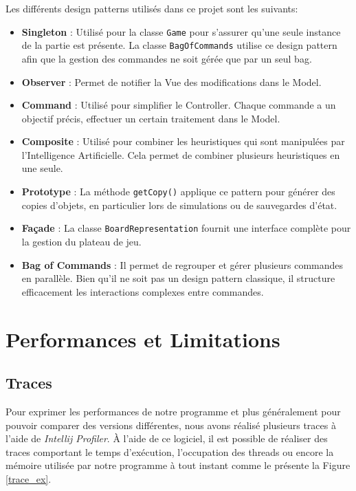 \documentclass{article}
\begin{document}
Les différents design patterns utilisés dans ce projet sont les suivants:
\begin{itemize}
    \item \textbf{Singleton} : Utilisé pour la classe \texttt{Game} pour s'assurer qu'une seule instance de la partie est présente.
    La classe \texttt{BagOfCommands} utilise ce design pattern afin que la gestion des commandes ne soit gérée que par un seul bag.
    \item \textbf{Observer} : Permet de notifier la Vue des modifications dans le Model.
    \item \textbf{Command} : Utilisé pour simplifier le Controller. Chaque commande a un objectif précis, effectuer un certain traitement dans le Model.
    \item \textbf{Composite} : Utilisé pour combiner les heuristiques qui sont manipulées par l'Intelligence Artificielle. Cela permet de combiner plusieurs heuristiques en une seule.
    \item \textbf{Prototype} : La méthode \texttt{getCopy()} applique ce pattern pour générer des copies d’objets, en particulier lors de simulations ou de sauvegardes d’état.
    \item \textbf{Façade} : La classe \texttt{BoardRepresentation} fournit une interface complète pour la gestion du plateau de jeu.
    \item \textbf{Bag of Commands} : Il permet de regrouper
    et gérer plusieurs commandes en parallèle. Bien qu’il ne soit pas un design pattern
    classique, il structure efficacement les interactions complexes entre commandes.
\end{itemize}


\section{Performances et Limitations}
\subsection{Traces}
Pour exprimer les performances de notre programme et plus généralement pour pouvoir comparer des versions différentes, nous avons réalisé plusieurs
traces à l'aide de \textit{Intellij Profiler}. À l'aide de ce logiciel, il est possible de réaliser des traces comportant le temps d'exécution, l'occupation des threads
ou encore la mémoire utilisée par notre programme à tout instant comme le présente la Figure \ref{trace_ex}.
\end{document}

